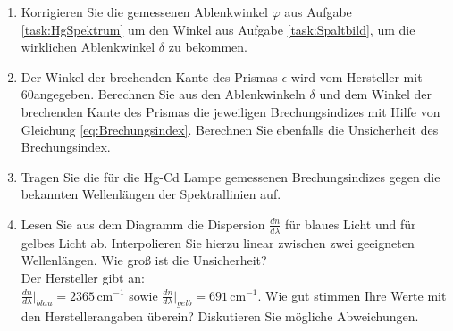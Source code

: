 \begin{enumerate}
 \item Korrigieren Sie die gemessenen Ablenkwinkel $\varphi$ aus Aufgabe \ref{task:HgSpektrum} um den Winkel aus Aufgabe \ref{task:Spaltbild}, um die wirklichen Ablenkwinkel $\delta$ zu bekommen.
 \item Der Winkel der brechenden Kante des Prismas $\epsilon$ wird vom Hersteller mit 60\degree angegeben. Berechnen Sie aus den Ablenkwinkeln $\delta$ und dem Winkel der brechenden Kante des Prismas die jeweiligen Brechungsindizes mit Hilfe von Gleichung \ref{eq:Brechungsindex}. Berechnen Sie ebenfalls die Unsicherheit des Brechungsindex.
 \item Tragen Sie die für die Hg-Cd Lampe gemessenen Brechungsindizes gegen die bekannten Wellenlängen der Spektrallinien auf.
 \item Lesen Sie aus dem Diagramm die Dispersion $\frac{dn}{d\lambda}$ für blaues Licht und für gelbes Licht ab. Interpolieren Sie hierzu linear zwischen zwei geeigneten Wellenlängen. Wie groß ist die Unsicherheit?\\
	Der Hersteller gibt an:\\
	$\frac{dn}{d\lambda}|_{blau} = 2365\,\mathrm{cm^{-1}}$ sowie $\frac{dn}{d\lambda}|_{gelb} = 691\,\mathrm{cm^{-1}}$. Wie gut stimmen Ihre Werte mit den Herstellerangaben überein? Diskutieren Sie mögliche Abweichungen.
\end{enumerate}


